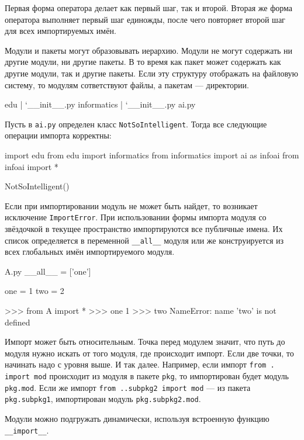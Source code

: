 Первая форма оператора делает как первый шаг, так и второй. Вторая же форма оператора выполняет первый шаг единожды, после чего повторяет второй шаг для всех импортируемых имён.

Модули и пакеты могут образовывать иерархию. Модули не могут содержать ни другие модули, ни другие пакеты. В то время как пакет может содержать как другие модули, так и другие пакеты. Если эту структуру отображать на файловую систему, то модулям сответствуют файлы, а пакетам --- директории.
\begin{plainlst}{}{}
edu
|
`__init__.py
 informatics
 |
 `__init__.py
  ai.py
\end{plainlst}

Пусть в \texttt{ai.py} определен класс \lstinline{NotSoIntelligent}. Тогда все следующие операции импорта корректны:
\begin{pylst}{}{}
import edu
from edu import informatics
from informatics import ai as infoai
from infoai import *

NotSoIntelligent()
\end{pylst}

Если при импортировании модуль не может быть найдет, то возникает исключение \lstinline{ImportError}. При использовании формы импорта модуля со звёздочкой в текущее пространство импортируются все публичные имена. Их список определяется в переменной \lstinline{__all__} модуля или же конструируется из всех глобальных имён импортируемого модуля.
\begin{pylst}{A.py}{}
__all__ = ['one']

one = 1
two = 2
\end{pylst}

\begin{pylst}{}{}
>>> from A import *
>>> one
1
>>> two
NameError: name 'two' is not defined
\end{pylst}

Импорт может быть относительным. Точка перед модулем значит, что путь до модуля нужно искать от того модуля, где происходит импорт. Если две точки, то начинать надо с уровня выше. И так далее. Например, если импорт \lstinline{from . import mod} происходит из модуля в пакете \lstinline{pkg}, то импортирован будет модуль \lstinline{pkg.mod}. Если же импорт \lstinline{from ..subpkg2 import mod} --- из пакета \lstinline{pkg.subpkg1}, импортирован модуль \lstinline{pkg.subpkg2.mod}.

Модули можно подгружать динамически, используя встроенную функцию \lstinline{__import__}.

